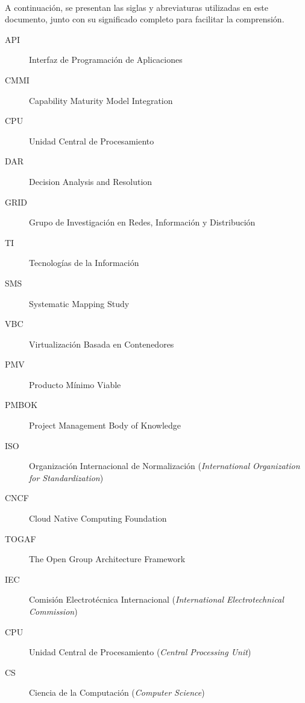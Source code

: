 \label{cap:siglas}
\mbox{}\\
A continuación, se presentan las siglas y abreviaturas utilizadas en este documento, junto con su significado completo para facilitar la comprensión.
\begin{description}
  \item[API] Interfaz de Programación de Aplicaciones
  \item[CMMI] Capability Maturity Model Integration
  \item[CPU] Unidad Central de Procesamiento
  \item[DAR] Decision Analysis and Resolution
  \item[GRID] Grupo de Investigación en Redes, Información y Distribución
  \item[TI] Tecnologías de la Información
  \item[SMS] Systematic Mapping Study
  \item[VBC] Virtualización Basada en Contenedores
  \item[PMV] Producto Mínimo Viable
  \item[PMBOK] Project Management Body of Knowledge
  \item[ISO] Organización Internacional de Normalización (\textit{International Organization for Standardization})
  \item[CNCF] Cloud Native Computing Foundation
  \item[TOGAF] The Open Group Architecture Framework
  \item[IEC] Comisión Electrotécnica Internacional (\textit{International Electrotechnical Commission})
  \item[CPU] Unidad Central de Procesamiento (\textit{Central Processing Unit})
  \item[CS] Ciencia de la Computación (\textit{Computer Science})
\end{description}